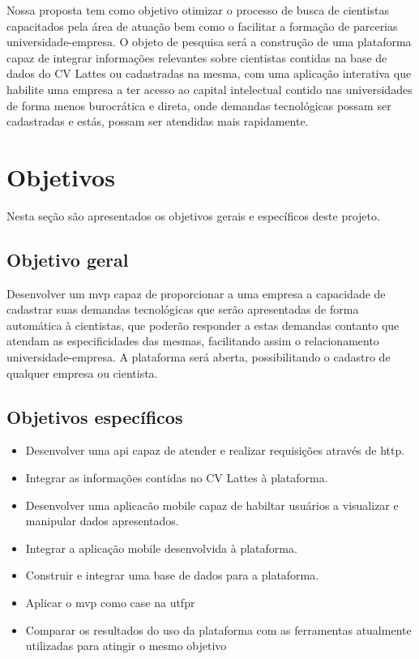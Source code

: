 Nossa proposta tem como objetivo otimizar o processo de busca de cientistas capacitados pela área de atuação bem como o facilitar a formação de parcerias universidade-empresa. O objeto de pesquisa será a construção de uma plataforma capaz de integrar informações relevantes sobre cientistas contidas na base de dados do CV Lattes ou cadastradas na mesma, com uma aplicação interativa que habilite uma empresa a ter acesso ao capital intelectual contido nas universidades de forma menos burocrática e direta, onde demandas tecnológicas possam ser cadastradas e estás, possam ser atendidas mais rapidamente.

\section{Objetivos}\label{sec:objetivos}

Nesta seção são apresentados os objetivos gerais e específicos deste projeto.

\subsection{Objetivo geral}\label{subsec:objetivoGeral}

Desenvolver um \gls{mvp} capaz de proporcionar a uma empresa a capacidade de cadastrar suas demandas tecnológicas que serão apresentadas de forma automática à cientistas, que poderão responder a estas demandas contanto que atendam as especificidades das mesmas, facilitando assim o relacionamento universidade-empresa. A plataforma será aberta, possibilitando o cadastro de qualquer empresa ou cientista.

\subsection{Objetivos específicos}\label{subsec:objetivosEspecificos}

\begin{itemize}
    \item Desenvolver uma \gls{api} capaz de atender e realizar requisições através de \gls{http}.
    \item Integrar as informações contidas no CV Lattes à plataforma.
    \item Desenvolver uma aplicacão mobile capaz de habiltar usuários a visualizar e manipular dados apresentados.
    \item Integrar a aplicação mobile desenvolvida à plataforma.
    \item Construir e integrar uma base de dados para a plataforma.
    \item Aplicar o \gls{mvp} como case na \gls{utfpr}
    \item Comparar os resultados do uso da plataforma com as ferramentas atualmente utilizadas para atingir o mesmo objetivo
\end{itemize}

